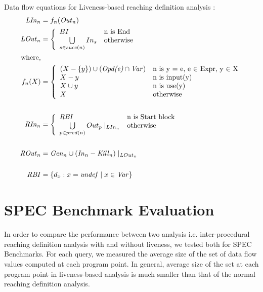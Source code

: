 \documentclass[11pt,a4paper,openright]{report}
\begin{document}
Data flow equations for Liveness-based reaching definition analysis :
\begin{equation}
\begin{split}
\mbox{\textit{LIn}}_n &= f_n(\mbox{\textit{Out}}_n) \\
\mbox{\textit{LOut}}_n &= \left\{ \begin{array}{ll}
	  BI & \mbox{n is End}\\
	  \bigcup\limits_{s \in succ(n)} In_s & \mbox{otherwise}
	  \end{array} \right.\\ 
\mbox{where,}\\
f_n(X) &= \left\{ \begin{array}{ll}
	  (X-\{y\})\cup(\mbox{\textit{Opd(e)}}\cap \mbox{\textit{Var}}) & \mbox{n is y = e, e $\in$ Expr, y $\in$ X}\\
	  X-{y} & \mbox{n is input(y)}\\
	  X \cup {y} & \mbox{n is use(y)} \\
	  X & \mbox{otherwise}
	  \end{array} \right.\\ 
\\
\mbox{\textit{RIn}}_n &= \left\{ \begin{array}{ll}
	  \mbox{\textit{RBI}} & \mbox{n is Start block}\\
	  \bigcup\limits_{p \in pred(n)}Out_p\mid_{LIn_n} & \mbox{otherwise}
	  \end{array} \right.\\ 
	  \\
\mbox{\textit{ROut}}_n &= \mbox{\textit{Gen}}_n \cup (\mbox{\textit{In}}_n - \mbox{\textit{Kill}}_n) \mid_{LOut_n} \\
\\
\mbox{\textit{RBI}} &= \{d_x : x = \mbox{\textit{undef}} \mid x \in \mbox{\textit{Var}}\} \\	  
\end{split} 
\end{equation}



\section*{SPEC Benchmark Evaluation}
In order to compare the performance between two analysis i.e. inter-procedural reaching definition analysis with and without liveness, we tested both for SPEC Benchmarks.
For each query, we measured the average size of the set of data flow values computed at each program point. In general, average size of the set at each
program point in liveness-based analysis is much smaller than that of the normal reaching definition analysis.
\end{document}
